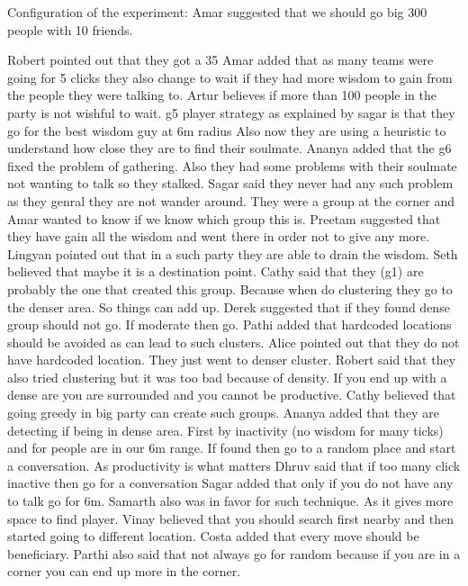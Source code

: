 Configuration of the experiment:
Amar suggested that we should go big 300 people with 10 friends.

Robert pointed out that they got a 35%
Amar added that as many teams were going for 5 clicks they also change to wait if they had more wisdom to gain from the people they were talking to.
Artur believes if more than 100 people in the party is not wishful to wait.
g5 player strategy as explained by sagar is that they go for the best wisdom guy at 6m radius
Also now they are using a heuristic to understand how close they are to find their soulmate.
Ananya added that the g6 fixed the problem of gathering. Also they had some problems with their soulmate not wanting to talk so they stalked. 
Sagar said they never had any such problem as they genral they are not wander around.
They were a group at the corner and Amar wanted to know if we know which group this is.
Preetam suggested that they have gain all the wisdom and went there in order not to give any more. 
Lingyan pointed out that in a such party they are able to drain the wisdom.
Seth believed that maybe it is a destination point.
Cathy said that they (g1) are probably the one that created this group. Because when do clustering they go to the denser area. So things can add up.
Derek suggested that if they found dense group should not go. If moderate then go.
Pathi added that hardcoded locations should be avoided as can lead to such clusters.
Alice pointed out that they do not have hardcoded location. They just went to denser cluster.
Robert said that they also tried clustering but it was too bad because of density. If you end up with a dense are you are surrounded and you cannot be productive.
Cathy believed that going greedy in big party can create such groups.
Ananya added that they are detecting if being in dense area. First by inactivity (no wisdom for many ticks) and for people are in our 6m range. If found then go to a random place and start a conversation.
As productivity is what matters Dhruv said that if too many click inactive then go for a conversation
Sagar added that only if you do not have any to talk go for 6m.
Samarth also was in favor for such technique. As it gives more space to find player.
Vinay believed that you should search first nearby and then started going to different location.
Costa added that every move should be beneficiary.
Parthi also said that not always go for random because if you are in a corner you can end up more in the corner.


